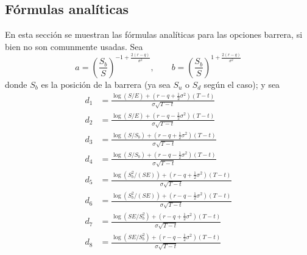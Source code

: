 \subsection{Fórmulas analíticas}
En esta sección se muestran las fórmulas analíticas para las opciones barrera, si bien no son comunmente usadas. Sea
\[
    a = \left( \frac{S_b}{S} \right)^{-1 + \frac{2(r-q)}{\sigma^2}}, \qquad
    b = \left( \frac{S_b}{S} \right)^{1 + \frac{2(r-q)}{\sigma^2}}
\]
donde $S_b$ es la posición de la barrera (ya sea $S_u$ o $S_d$ según el caso); y sea
\begin{align*}
    d_1 &= \frac{\log(S/E) + (r-q + \frac{1}{2}\sigma^2)(T-t)}{\sigma\sqrt{T-t}} \\
    d_2 &= \frac{\log(S/E) + (r-q - \frac{1}{2}\sigma^2)(T-t)}{\sigma\sqrt{T-t}} \\
    d_3 &= \frac{\log(S/S_b) + (r-q + \frac{1}{2}\sigma^2)(T-t)}{\sigma\sqrt{T-t}} \\
    d_4 &= \frac{\log(S/S_b) + (r-q - \frac{1}{2}\sigma^2)(T-t)}{\sigma\sqrt{T-t}} \\
    d_5 &= \frac{\log(S_b^2/(SE)) + (r-q + \frac{1}{2}\sigma^2)(T-t)}{\sigma\sqrt{T-t}} \\
    d_6 &= \frac{\log(S_b^2/(SE)) + (r-q - \frac{1}{2}\sigma^2)(T-t)}{\sigma\sqrt{T-t}} \\
    d_7 &= \frac{\log(SE/S_b^2) + (r-q + \frac{1}{2}\sigma^2)(T-t)}{\sigma\sqrt{T-t}} \\
    d_8 &= \frac{\log(SE/S_b^2) + (r-q - \frac{1}{2}\sigma^2)(T-t)}{\sigma\sqrt{T-t}}
\end{align*}


